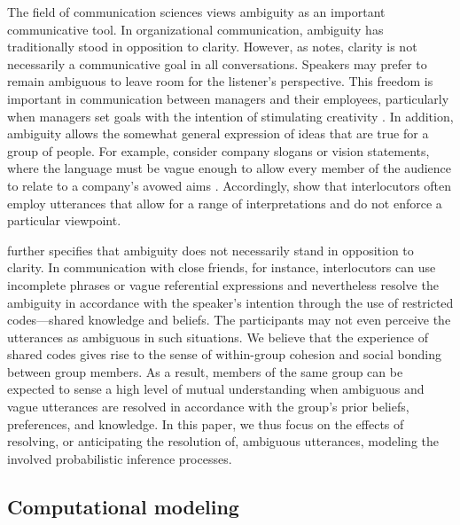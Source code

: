 \documentclass[10pt,a4paper]{article}
\newcommand{\gcs}[1]{\textcolor{blue}{[gcs: #1]}}
\begin{document}
The field of communication sciences views ambiguity as an important communicative tool. %
In organizational communication, ambiguity has traditionally stood in opposition to clarity. However, as  notes, clarity is not necessarily a communicative goal in all conversations. Speakers may prefer to remain ambiguous to leave room for the listener's perspective. This freedom is important in communication between managers and their employees, particularly when managers set goals with the intention of stimulating creativity \cite{mohr1983implications}.
In addition, ambiguity allows the somewhat general expression of ideas that are true for a group of people. 
For example, consider company slogans or vision statements, where the language must be vague enough to allow every member of the audience to relate to a company's avowed aims \cite{carmon2013}. 
Accordingly,  show that interlocutors often employ utterances that allow for a range of interpretations and do not enforce a particular viewpoint.

 further specifies that ambiguity does not necessarily stand in opposition to clarity. In communication with close friends, for instance, interlocutors can use incomplete phrases or vague referential expressions and nevertheless resolve the ambiguity in accordance with the speaker's intention through the use of restricted codes---shared knowledge and beliefs. The participants may not even perceive the utterances as ambiguous in such situations. We believe that the experience of shared codes gives rise to the sense of within-group cohesion and social bonding between group members.
As a result, members of the same group can be expected to sense a high level of mutual understanding when ambiguous and vague utterances are resolved in accordance with the group's prior beliefs, preferences, and knowledge.
In this paper, we thus focus on the effects of resolving, or anticipating the resolution of, ambiguous utterances, modeling the involved probabilistic inference processes. 



\subsection{Computational modeling}
\end{document}
